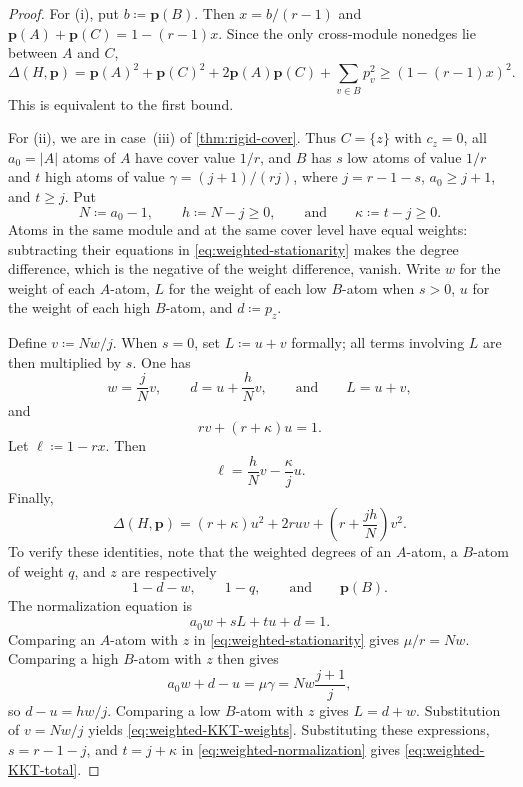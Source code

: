 \documentclass[10pt]{article}
\numberwithin{equation}{section}
\newcommand{\vct}[1]{\boldsymbol{#1}}
\begin{document}
\begin{proof}
For \textup{(i)}, put $b\coloneqq\vct p(B)$.  Then $x=b/(r-1)$ and $\vct p(A)+\vct p(C)=1-(r-1)x$.  Since the only cross-module nonedges lie between $A$ and $C$,
\[
 \Delta(H,\vct p)
 =\vct p(A)^2+\vct p(C)^2+2\vct p(A)\vct p(C)
   +\sum_{v\in B}p_v^2
 \ge(1-(r-1)x)^2.
\]
This is equivalent to the first bound.

For \textup{(ii)}, we are in case~\textup{(iii)} of \cref{thm:rigid-cover}.  Thus $C=\{z\}$ with $c_z=0$, all $a_0=|A|$ atoms of $A$ have cover value $1/r$, and $B$ has $s$ low atoms of value $1/r$ and $t$ high atoms of value $\gamma=(j+1)/(rj)$, where $j=r-1-s$, $a_0\ge j+1$, and $t\ge j$.  Put
\begin{equation}\label{eq:Nhk-definitions}
 N\coloneqq a_0-1,
 \qquad h\coloneqq N-j\ge0,
 \qquad\text{and}\qquad \kappa\coloneqq t-j\ge0.
\end{equation}
Atoms in the same module and at the same cover level have equal weights: subtracting their equations in \cref{eq:weighted-stationarity} makes the degree difference, which is the negative of the weight difference, vanish.  Write $w$ for the weight of each $A$-atom, $L$ for the weight of each low $B$-atom when $s>0$, $u$ for the weight of each high $B$-atom, and $d\coloneqq p_z$.

Define $v\coloneqq Nw/j$.  When $s=0$, set $L\coloneqq u+v$ formally; all terms involving $L$ are then multiplied by $s$.  One has
\begin{equation}\label{eq:weighted-KKT-weights}
 w=\frac jNv,
 \qquad
 d=u+\frac hNv,
 \qquad\text{and}\qquad
 L=u+v,
\end{equation}
and
\begin{equation}\label{eq:weighted-KKT-total}
 rv+(r+\kappa)u=1.
\end{equation}
Let $\ell\coloneqq1-rx$.  Then
\begin{equation}\label{eq:weighted-KKT-ell}
 \ell=\frac hNv-\frac\kappa j u.
\end{equation}
Finally,
\begin{equation}\label{eq:weighted-KKT-deficiency}
 \Delta(H,\vct p)
 =(r+\kappa)u^2+2ruv+
 \left(r+\frac{jh}{N}\right)v^2.
\end{equation}
To verify these identities, note that the weighted degrees of an $A$-atom, a $B$-atom of weight $q$, and $z$ are respectively
\[
 1-d-w,
 \qquad 1-q,
 \qquad\text{and}\qquad \vct p(B).
\]
The normalization equation is
\begin{equation}\label{eq:weighted-normalization}
 a_0w+sL+tu+d=1.
\end{equation}
Comparing an $A$-atom with $z$ in \cref{eq:weighted-stationarity} gives $\mu/r=Nw$.  Comparing a high $B$-atom with $z$ then gives
\[
 a_0w+d-u=\mu\gamma=Nw\frac{j+1}{j},
\]
so $d-u=hw/j$.  Comparing a low $B$-atom with $z$ gives $L=d+w$.  Substitution of $v=Nw/j$ yields \cref{eq:weighted-KKT-weights}.  Substituting these expressions, $s=r-1-j$, and $t=j+\kappa$ in \cref{eq:weighted-normalization} gives \cref{eq:weighted-KKT-total}.


\end{proof}
\end{document}
